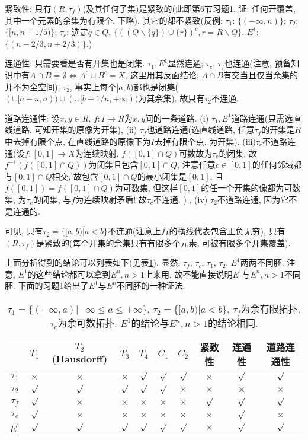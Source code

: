 \documentclass{ctexart}%
\theoremstyle{definition}
\theoremstyle{remark}
\begin{document}
紧致性: 只有$(R,\tau_f)$(及其任何子集)是紧致的(此即第6节习题1. 证: 任何开覆盖, 其中一个元素的余集为有限个. 下略). 其它的都不紧致(反例: $\tau_1$: $\{(-\infty,n)\}$; $\tau_2$: $\{[n,n+1/5)\}$; $\tau_c$:
选定$q\in Q$, $\{((Q\backslash \{q\})\cup \{r\})^c, r=R\backslash Q\}$. $E^1$: $\{(n-2/3, n+2/3)\}$.)

连通性: 只需要看是否有开集也是闭集. $\tau_1, E^1$显然连通; $\tau_c$, $\tau_f$也连通(注意, 预备知识中有$A\cap B=\emptyset\Longleftrightarrow A^c\cup B^c=X$, 这里用其反面结论: $A\cap B$有交当且仅当余集的并不为全空间); $\tau_2$, 事实上每个$[a,b)$都也是闭集($(\cup[a-n,a))\cup(\cup[b+1/n,+\infty))$为其余集), 故只有$\tau_2$不连通. 

道路连通性: 设$x,y\in R$, $f:I\rightarrow R$为$x,y$间的一条道路. (i) $\tau_1, E^1$道路连通(只需选直线道路, 可知开集的原像为开集), (ii) $\tau_f$也道路连通(选直线道路, 任意$\tau_f$的开集是$R$中去掉有限个点, 在直线道路的原像下为$I$去掉有限个点, 为开集), (iii)$\tau_c$不道路连通(设$f: [0,1]\rightarrow X$为连续映射, $f([0,1]\cap Q)$可数故为$\tau_c$的闭集, 故$f^{-1}(f([0,1]\cap Q))$为闭集且包含$[0,1]\cap Q$, 注意任意$c\in [0,1]$的任何邻域都与$[0,1]\cap Q$相交, 故包含$[0,1]\cap Q$的最小闭集是$[0,1]$, 且$f([0,1])=f([0,1]\cap Q)$为可数集, 但这样$[0,1]$的任一个开集的像都为可数集, 为$\tau_c$的闭集, 与$f$为连续映射矛盾! 故$\tau_c$不连通. ) , (iv) $\tau_2$不道路连通, 因为它不是连通的. 

可见, 只有$\tau_2 =\overline{\{[a,b)|a<b\}}$不连通(注意上方的横线代表包含正负无穷), 只有$(R,\tau_f)$是紧致的(每个开集的余集只有有限多个元素, 可被有限多个开集覆盖). 

上面分析得到的结论可以列表如下(见表\ref{table1}). 显然, $\tau_f$, $\tau_c$, $\tau_1$, $\tau_2$, $E^1$两两不同胚. 注意, $E^1$的这些结论都可以拿到$E^n,n>1$上来用, 故不能直接说明$E^1$与$E^n, n>1$不同胚. 下面的习题1给出了$E^1$与$E^n$不同胚的一种证法. 

\begin{table}[!t]
\centering
\begin{tabular}{|c|c|c|c|c|c|c|c|c|c|}
\hline
\hline
&$T_1$&$T_2$(Hausdorff)&$T_3$&$T_4$&$C_1$&$C_2$&紧致性&连通性&道路连通性\\
\hline
$\tau_1$ &$\times$  &$\times$  &$\times$  &$\surd$   &$\surd$   &$\surd$ &$\times$&$\surd$&$\surd$  \\
\hline
$\tau_2$ &$\surd$   &$\surd$   &$\surd$   &$\surd$   &$\surd$   &$\times$&$\times$&$\times$&$\times$\\
\hline
$\tau_f$ &$\surd$   &$\times$  &$\times$  &$\times$  &$\times$  &$\times$&$\surd$&$\surd$&$\surd$  \\
\hline
$\tau_c$ &$\surd$   &$\times$  &$\times$  &$\times$  &$\times$  &$\times$&$\times$&$\surd$&$\times$\\
\hline
$E^1$    &$\surd$   &$\surd$   &$\surd$   &$\surd$   &$\surd$   &$\surd$&$\times$&$\surd$&$\surd$\\
\hline
\hline
\end{tabular}
\caption{$\tau_1=\{(-\infty,a)|-\infty\leq a\leq+\infty\}$, $\tau_2 =\overline{\{[a,b)|a<b\}}$, $\tau_f$为余有限拓扑, $\tau_c$为余可数拓扑. $E^1$的结论与$E^n,n>1$的结论相同. }\label{table1}
\end{table}
\end{document}
